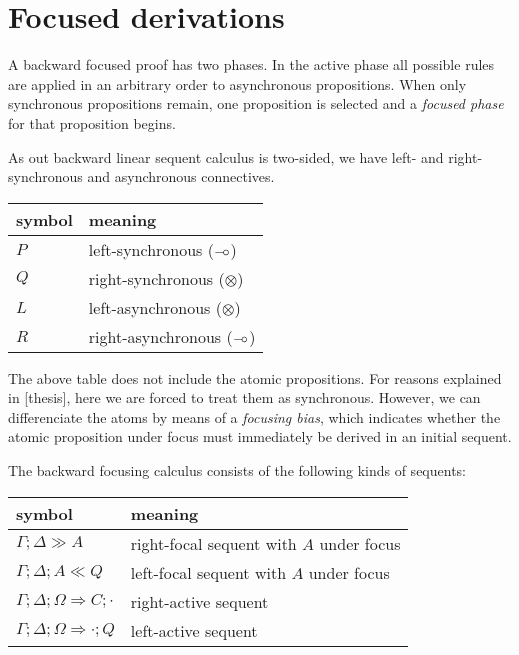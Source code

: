 \section{Focused derivations}

A backward focused proof has two phases. In the active phase all possible rules
are applied in an arbitrary order to asynchronous propositions. When only
synchronous propositions remain, one proposition is selected and a \emph{focused
  phase} for that proposition begins.

As out backward linear sequent calculus is two-sided, we have left- and right-
synchronous and asynchronous connectives.

\begin{table}[h]
  \centering
  \begin{tabular}{|l|l|}
    \hline
    \textbf{symbol} & \textbf{meaning} \\
    \hline
    $P$ & left-synchronous ($\mathbin{{-}\mkern-3.5mu{\circ}}$) \\
    $Q$ & right-synchronous ($\otimes$) \\
    $L$ & left-asynchronous ($\otimes$) \\
    $R$ & right-asynchronous ($\mathbin{{-}\mkern-3.5mu{\circ}}$) \\
    \hline
  \end{tabular}
\end{table}

The above table does not include the atomic propositions. For reasons explained
in [thesis], here we are forced to treat them as synchronous. However, we can
differenciate the atoms by means of a \emph{focusing bias}, which indicates
whether the atomic proposition under focus must immediately be derived in an
initial sequent.

The backward focusing calculus consists of the following kinds of sequents:

\begin{table}[h]
  \centering
  \begin{tabular}{|l|l|}
    \hline
    \textbf{symbol} & \textbf{meaning} \\
    \hline
    $\Gamma; \Delta \gg A$ & right-focal sequent with $A$ under focus \\
    $\Gamma; \Delta; A \ll Q$ & left-focal sequent with $A$ under focus \\
    $\Gamma; \Delta; \Omega \Longrightarrow C; \cdot$ & right-active sequent \\
    $\Gamma; \Delta; \Omega \Longrightarrow \cdot; Q$ & left-active sequent \\
    \hline
  \end{tabular}
\end{table}

